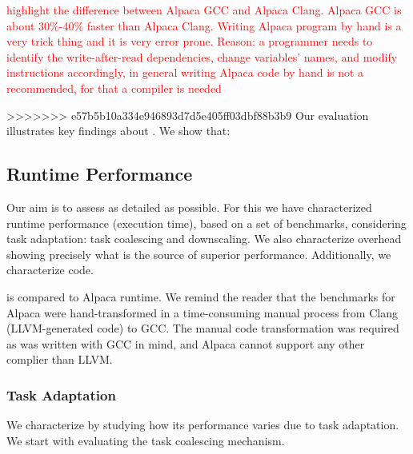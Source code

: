 \textcolor{red}{highlight the difference between Alpaca GCC and Alpaca Clang. Alpaca GCC is about 30\%-40\% faster than Alpaca Clang. Writing Alpaca program by hand is a very trick thing and it is very error prone. Reason: a programmer needs to identify the write-after-read dependencies, change variables' names, and modify instructions accordingly, in general writing Alpaca code by hand is not a recommended, for that a compiler is needed}

>>>>>>> e57b5b10a334e946893d7d5e405ff03dbf88b3b9
Our evaluation illustrates key findings about \sys. We show that: 


\subsection{\sys Runtime Performance}
\label{sec:results_evaluation}

Our aim is to assess \sys as detailed as possible. For this we have characterized \sys runtime performance (execution time), based on a set of benchmarks, considering task adaptation: task coalescing and downscaling. We also characterize \sys overhead showing precisely what is the source of \sys superior performance. Additionally, we characterize \sys code. 

\sys is compared to Alpaca runtime. We remind the reader that the benchmarks for Alpaca were hand-transformed in a time-consuming manual process from Clang (LLVM-generated code) to GCC. The manual code transformation was required as \sys was written with GCC in mind, and Alpaca cannot support any other complier than LLVM.

\subsubsection{\sys Task Adaptation}
\label{sec:result_coalescing}

We characterize \sys by studying how its performance varies due to task adaptation. We start with evaluating the task coalescing mechanism.

